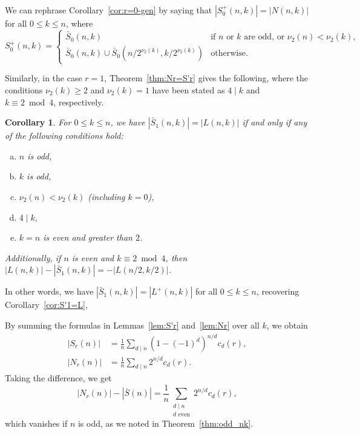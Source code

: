 \documentclass[12pt]{article}
\newcommand{\card}[1]{\left|#1\right|}
\newcommand{\bS}{\bar{S}}
\newtheorem{corollary}[theorem]{Corollary}
\theoremstyle{definition}
\begin{document}
We can rephrase Corollary~\ref{cor:r=0-gen} by saying that 
 $\card{S_0^+(n, k)}=\card{N(n, k)}$ for all $0\le k\le n$, where 
\begin{equation*}
    S_0^+(n, k)
    =
    \begin{cases}
        \bS_0(n, k) & \text{if $n$ or $k$ are odd, or $\nu_2(n) < \nu_2(k)$,} \\
        \bS_0(n, k) \cup \bS_0(n / 2^{\nu_2(k)}, k / 2^{\nu_2(k)}) & \text{otherwise}.
    \end{cases}
\end{equation*}

Similarly, in the case $r=1$, Theorem~\ref{thm:Nr=S'r} 
gives the following, where the conditions $\nu_2(k)\ge2$ and $\nu_2(k)=1$ have been stated as $4\mid k$ and $k\equiv 2\bmod 4$, respectively.

\begin{corollary}
    \label{cor:r=1-gen}
    For $0\le k\le n$, we have $\card{\bS_1(n, k)} = \card{L(n, k)}$ if and only if any of the following conditions hold:
    \begin{enumerate}[(a)]
        \item $n$ is odd,
        \item $k$ is odd,
        \item $\nu_2(n) < \nu_2(k)$ (including $k = 0$),
        \item $4\mid k$,
        \item $k = n$ is even and greater than $2$.
    \end{enumerate}
    Additionally, if $n$ is even and $k\equiv 2\bmod 4$, then 
    $\card{L(n, k)} - \card{\bS_1(n, k)} = -\card{L(n/2, k/2)}$.
\end{corollary}

In other words, we have $\card{\bS_1(n, k)} = \card{L^+(n, k)}$ for all $0\le k\le n$, recovering Corollary~\ref{cor:S'1=L},

By summing the formulas in Lemmas~\ref{lem:S'r} and~\ref{lem:Nr} over all $k$, we obtain
    \begin{align*}
        \card{S_r(n)} &= \frac{1}{n} \sum_{d \mid n} (1 - (-1)^d)^{n/d} c_d(r),\\
        \card{N_r(n)} &= \frac{1}{n} \sum_{d \mid n} 2^{n / d} c_d(r).
    \end{align*}
Taking the difference, we get
\begin{equation}\label{eq:Nr-S}
        \card{N_r(n)} - \card{\bS(n)}
            = \frac{1}{n} \sum_{\substack{d \mid n \\ d \text{ even}}} 2^{n/d} c_d(r),
\end{equation}
which vanishes if $n$ is odd, as we noted in Theorem~\ref{thm:odd_nk}.
\end{document}
